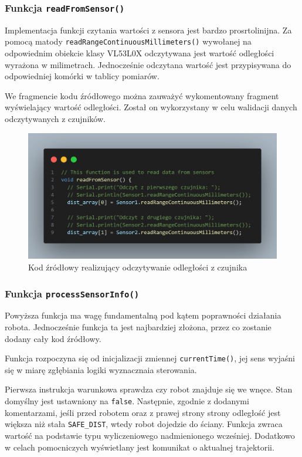 \documentclass{report}
\begin{document}
\subsubsection*{Funkcja \texttt{readFromSensor()}}

Implementacja funkcji czytania wartości z sensora jest bardzo prosrtolinijna. Za pomocą matody \texttt{readRangeContinuousMillimeters()} wywołanej na odpowiednim obiekcie klasy VL53L0X odczytywana jest wartość odległości wyrażona w milimetrach. Jednocześnie odczytana wartość jest przypisywana do odpowiedniej komórki w tablicy pomiarów. 

We fragmencie kodu źródłowego można zauważyć wykomentowany fragment wyświelający wartość odległości. Został on wykorzystany w celu walidacji danych odczytywanych z czujników.

\begin{figure}[H]
    \centering
    \includegraphics[width=1.0\textwidth]{src/code_snaps/readFromSensor.png}
    \caption{Kod źródłowy realizujący odczytywanie odległości z czujnika}
\end{figure}

\subsubsection*{Funkcja \texttt{processSensorInfo()}}

Powyższa funkcja ma wagę fundamentalną pod kątem poprawności działania robota. Jednocześnie funkcja ta jest najbardziej złożona, przez co zostanie dodany cały kod źródłowy. 

Funkcja rozpoczyna się od inicjalizacji zmiennej \texttt{currentTime()}, jej sens wyjaśni się w miarę zgłębiania logiki wyznacznaia sterowania. 

Pierwsza instrukcja warunkowa sprawdza czy robot znajduje się we wnęce. Stan domyślny jest ustawniony na \texttt{false}. Następnie, zgodnie z dodanymi komentarzami, jeśli przed robotem oraz z prawej strony strony odległość jest większa niż stała \texttt{SAFE\_DIST}, wtedy robot dojedzie do ściany. Funkcja zwraca wartość na podstawie typu wyliczeniowego nadmienionego wcześniej. Dodatkowo w celach pomocniczych wyświetlany jest komunikat o aktualnej trajektorii. 
\end{document}
